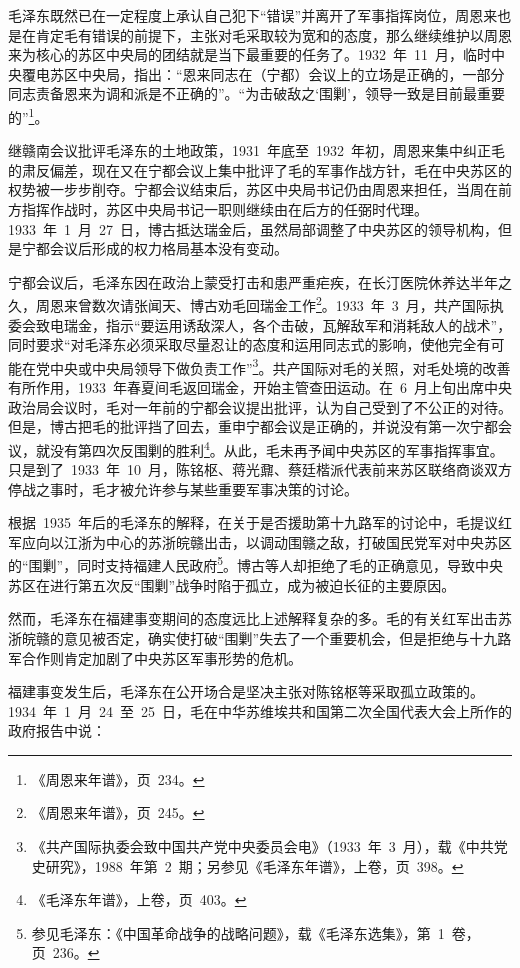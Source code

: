毛泽东既然已在一定程度上承认自己犯下“错误”并离开了军事指挥岗位，周恩来也是在肯定毛有错误的前提下，主张对毛采取较为宽和的态度，那么继续维护以周恩来为核心的苏区中央局的团结就是当下最重要的任务了。1932~年~11~月，临时中央覆电苏区中央局，指出：“恩来同志在（宁都）会议上的立场是正确的，一部分同志责备恩来为调和派是不正确的”。“为击破敌之‘围剿’，领导一致是目前最重要的”\footnote{《周恩来年谱》，页~234。}。

继赣南会议批评毛泽东的土地政策，1931~年底至~1932~年初，周恩来集中纠正毛的肃反偏差，现在又在宁都会议上集中批评了毛的军事作战方针，毛在中央苏区的权势被一步步削夺。宁都会议结束后，苏区中央局书记仍由周恩来担任，当周在前方指挥作战时，苏区中央局书记一职则继续由在后方的任弼时代理。1933~年~1~月~27~日，博古抵达瑞金后，虽然局部调整了中央苏区的领导机构，但是宁都会议后形成的权力格局基本没有变动。

宁都会议后，毛泽东因在政治上蒙受打击和患严重疟疾，在长汀医院休养达半年之久，周恩来曾数次请张闻天、博古劝毛回瑞金工作\footnote{《周恩来年谱》，页~245。}。1933~年~3~月，共产国际执委会致电瑞金，指示“要运用诱敌深人，各个击破，瓦解敌军和消耗敌人的战术”，同时要求“对毛泽东必须采取尽量忍让的态度和运用同志式的影响，使他完全有可能在党中央或中央局领导下做负责工作”\footnote{《共产国际执委会致中国共产党中央委员会电》（1933~年~3~月），载《中共党史研究》，1988~年第~2~期；另参见《毛泽东年谱》，上卷，页~398。}。共产国际对毛的关照，对毛处境的改善有所作用，1933~年春夏间毛返回瑞金，开始主管查田运动。在~6~月上旬出席中央政治局会议时，毛对一年前的宁都会议提出批评，认为自己受到了不公正的对待。但是，博古把毛的批评挡了回去，重申宁都会议是正确的，并说没有第一次宁都会议，就没有第四次反围剿的胜利\footnote{《毛泽东年谱》，上卷，页~403。}。从此，毛未再予闻中央苏区的军事指挥事宜。只是到了~1933~年~10~月，陈铭枢、蒋光鼐、蔡廷楷派代表前来苏区联络商谈双方停战之事时，毛才被允许参与某些重要军事决策的讨论。

根据~1935~年后的毛泽东的解释，在关于是否援助第十九路军的讨论中，毛提议红军应向以江浙为中心的苏浙皖赣出击，以调动围赣之敌，打破国民党军对中央苏区的“围剿”，同时支持福建人民政府\footnote{参见毛泽东：《中国革命战争的战略问题》，载《毛泽东选集》，第~1~卷，页~236。}。博古等人却拒绝了毛的正确意见，导致中央苏区在进行第五次反“围剿”战争时陷于孤立，成为被迫长征的主要原因。

然而，毛泽东在福建事变期间的态度远比上述解释复杂的多。毛的有关红军出击苏浙皖赣的意见被否定，确实使打破“围剿”失去了一个重要机会，但是拒绝与十九路军合作则肯定加剧了中央苏区军事形势的危机。

福建事变发生后，毛泽东在公开场合是坚决主张对陈铭枢等采取孤立政策的。1934~年~1~月~24~至~25~日，毛在中华苏维埃共和国第二次全国代表大会上所作的政府报告中说：

